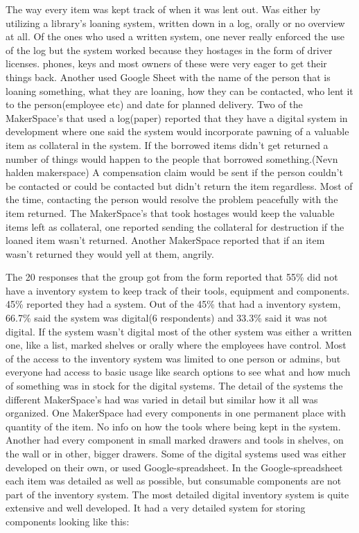 The way every item was kept track of when it was lent out. Was either by utilizing a library's loaning system, written down in a log, orally or no overview at all. Of the ones who used a written system, one never really enforced the use of the log but the system worked because they hostages in the form of driver licenses. phones, keys and most owners of these were very eager to get their things back. Another used Google Sheet with the name of the person that is loaning something, what they are loaning, how they can be contacted, who lent it to the person(employee etc) and date for planned delivery.
Two of the MakerSpace's that used a log(paper) reported that they have a digital system in development where one said the system would incorporate pawning of a valuable item as collateral in the system. 
If the borrowed items didn't get returned a number of things would happen to the people that borrowed something.(Nevn halden makerspace) A compensation claim would be sent if the person couldn't be contacted or could be contacted but didn't return the item regardless. Most of the time, contacting the person would resolve the problem peacefully with the item returned. The MakerSpace's that took hostages would keep the valuable items left as collateral, one reported sending the collateral for destruction if the loaned item wasn't returned. Another MakerSpace reported that if an item wasn't returned they would yell at them, angrily. 

The 20 responses that the group got from the form reported that 55\% did not have a inventory system to keep track of their tools, equipment and components. 45\% reported they had a system. Out of the 45\% that had a inventory system, 66.7\% said the system was digital(6 respondents) and 33.3\% said it was not digital. If the system wasn't digital most of the other system was either a written one, like a list, marked shelves or orally where the employees have control. Most of the access to the inventory system was limited to one person or admins, but everyone had access to basic usage like search options to see what and how much of something was in stock for the digital systems. 
The detail of the systems the different MakerSpace's had was varied in detail but similar how it all was organized. One MakerSpace had every components in one permanent place with quantity of the item. No info on how the tools where being kept in the system. Another had every component in small marked drawers and tools in shelves, on the wall or in other, bigger drawers. Some of the digital systems used was either developed on their own, or used Google-spreadsheet. In the Google-spreadsheet each item was detailed as well as possible, but consumable components are not part of the inventory system. The most detailed digital inventory system is quite extensive and well developed. It had a very detailed system for storing components looking like this:

